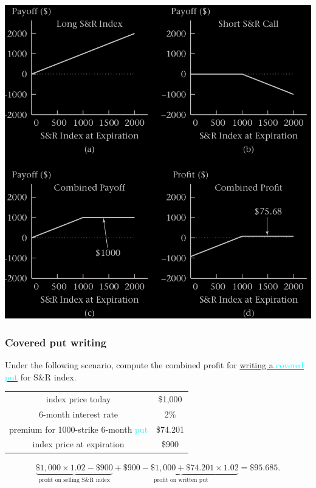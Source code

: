 \begin{frame}[fragile]
	\begin{center}
		\includegraphics[scale=0.25]{figs/Figure-3-4.png}
	\end{center}
\end{frame}
\begin{frame}[fragile,t]
	\frametitle{Covered put writing}
	\begin{myexample}
		Under the following scenario, compute the combined profit for \underline{writing a
		\textcolor{cyan}{covered put}}
		for S\&R index.
		\begin{center}
			\renewcommand{\arraystretch}{1.2}
			\begin{tabular}{|c|c|}
				\hline
				index price today                                     & \$1,000  \\
				6-month interest rate                                 & 2\%      \\
				premium for 1000-strike 6-month \textcolor{cyan}{put} & \$74.201 \\ \hline
				index price at expiration                             & \$900  \\ \hline
			\end{tabular}
		\end{center}
	\end{myexample}
	\vfill
	\pause
	\begin{mysol}
		\begin{align*}
			\underbrace{\$1,000 \times 1.02 - \$900}_{\text{profit on selling S\&R index}} +
			\underbrace{\$900-\$1,000 +\$74.201 \times 1.02}_{\text{profit on written put}} = \$95.685.
		\end{align*}
		\myEnd
	\end{mysol}
\end{frame}
